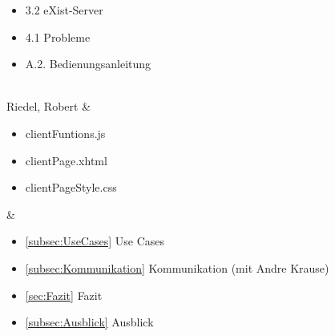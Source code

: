 \begin{table}[H]
\begin{tabu}
\begin{itemize}
		\item 3.2 eXist-Server
		\item 4.1 Probleme
		\item A.2. Bedienungsanleitung
\end{itemize}\\ \hline
		Riedel, Robert & \begin{itemize}
		\itemsep 0pt
		\item clientFuntions.js
		\item clientPage.xhtml
		\item clientPageStyle.css
\end{itemize} & \begin{itemize}
		\itemsep 0pt
		\item \ref{subsec:UseCases} Use Cases
		\item \ref{subsec:Kommunikation} Kommunikation (mit Andre Krause)
		\item \ref{sec:Fazit} Fazit
		\item \ref{subsec:Ausblick} Ausblick
\end{itemize}\\
	\end{tabu}
\end{table}